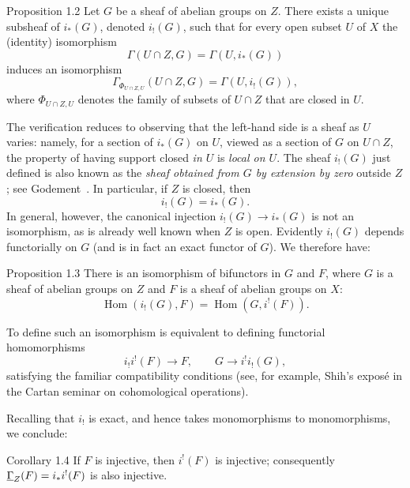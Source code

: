 \begin{sgastatement}{Proposition 1.2}
Let $G$ be a sheaf of abelian groups on $Z$.  There exists a unique
subsheaf of $i_*(G)$, denoted $i_!(G)$, such that for every open subset
$U$ of $X$ the (identity) isomorphism
\[
  \Gamma(U\cap Z,G)=\Gamma(U,i_*(G))
\]
induces an isomorphism
\[
  \Gamma_{\Phi_{U\cap Z,U}}(U\cap Z,G)=\Gamma(U,i_!(G)),
\]
where $\Phi_{U\cap Z,U}$ denotes the family of subsets of $U\cap Z$
that are closed in $U$.
\end{sgastatement}

The verification reduces to observing that the left-hand side is a
sheaf as $U$ varies: namely, for a section of $i_*(G)$ on $U$, viewed
as a section of $G$ on $U\cap Z$, the property of having support closed
\emph{in $U$} is \emph{local on $U$}.  The sheaf $i_!(G)$ just defined
is also known as the \emph{sheaf obtained from $G$ by extension by zero}
outside $Z$; see Godement~\cite{Godement}.  In particular, if $Z$ is
closed, then
\begin{equation}
  i_!(G)=i_*(G).
  \tag{9}\label{eq:I.9}
\end{equation}
In general, however, the canonical injection
$i_!(G)\to i_*(G)$ is not an isomorphism, as is already well known when
$Z$ is open.  Evidently $i_!(G)$ depends functorially on $G$ (and is in
fact an exact functor of $G$).  We therefore have:

\begin{sgastatement}{Proposition 1.3}
There is an isomorphism of bifunctors in $G$ and $F$, where $G$ is a
sheaf of abelian groups on $Z$ and $F$ is a sheaf of abelian groups on
$X$:
\begin{equation}
  \operatorname{Hom}(i_!(G),F)
  =\operatorname{Hom}(G,i^!(F)).
  \tag{10}\label{eq:I.10}
\end{equation}
\end{sgastatement}

To define such an isomorphism is equivalent to defining functorial
homomorphisms
\[
  i_!i^!(F)\longrightarrow F,
  \qquad
  G\longrightarrow i^!i_!(G),
\]
satisfying the familiar compatibility conditions (see, for example,
Shih's expos\'e in the Cartan seminar on cohomological operations).

Recalling that $i_!$ is exact, and hence takes
monomorphisms to monomorphisms, we conclude:

\begin{sgastatement}{Corollary 1.4}
If $F$ is injective, then $i^!(F)$ is injective; consequently
$\mathop{\underline{\Gamma}}\nolimits_Z(F)=i_*i^!(F)$ is also injective.
\end{sgastatement}

